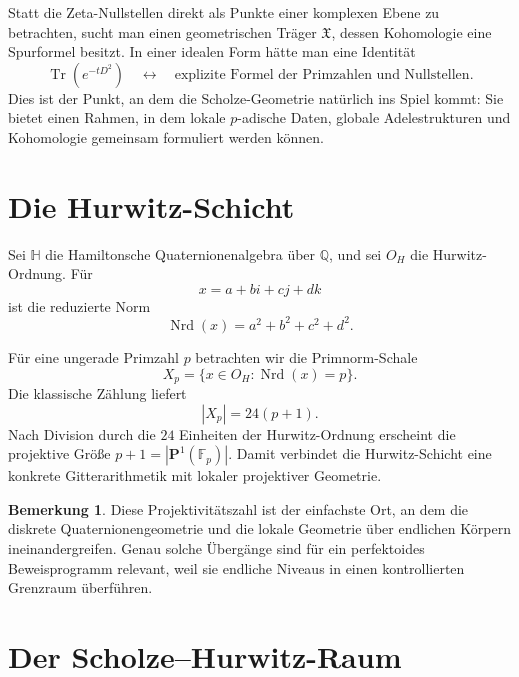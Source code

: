 \documentclass[11pt,a4paper,reqno]{amsart}
\theoremstyle{definition}
\newtheorem{remark}[theorem]{Bemerkung}
\numberwithin{equation}{section}
\newcommand{\Q}{\mathbb{Q}}
\newcommand{\HH}{\mathbb{H}}
\newcommand{\OH}{O_H}
\newcommand{\Nrd}{\operatorname{Nrd}}
\begin{document}
Statt die Zeta-Nullstellen direkt als Punkte einer komplexen Ebene zu betrachten, sucht man einen geometrischen Träger \(\mathfrak{X}\), dessen Kohomologie eine Spurformel besitzt. In einer idealen Form hätte man eine Identität
\begin{equation}
  \operatorname{Tr}\!\left(e^{-tD^2}\right)
  \quad\longleftrightarrow\quad
  \text{explizite Formel der Primzahlen und Nullstellen}.
\end{equation}
Dies ist der Punkt, an dem die Scholze-Geometrie natürlich ins Spiel kommt: Sie bietet einen Rahmen, in dem lokale \(p\)-adische Daten, globale Adelestrukturen und Kohomologie gemeinsam formuliert werden können.

\section{Die Hurwitz-Schicht}

Sei \(\HH\) die Hamiltonsche Quaternionenalgebra über \(\Q\), und sei \(\OH\) die Hurwitz-Ordnung. Für
\[
  x=a+bi+cj+dk
\]
ist die reduzierte Norm
\begin{equation}
  \Nrd(x)=a^2+b^2+c^2+d^2.
\end{equation}

Für eine ungerade Primzahl \(p\) betrachten wir die Primnorm-Schale
\begin{equation}
  X_p=\{x\in\OH:\Nrd(x)=p\}.
\end{equation}
Die klassische Zählung liefert
\begin{equation}
  |X_p|=24(p+1).
\end{equation}
Nach Division durch die \(24\) Einheiten der Hurwitz-Ordnung erscheint die projektive Größe \(p+1=|\mathbf{P}^1(\mathbb{F}_p)|\). Damit verbindet die Hurwitz-Schicht eine konkrete Gitterarithmetik mit lokaler projektiver Geometrie.

\begin{remark}
Diese Projektivitätszahl ist der einfachste Ort, an dem die diskrete Quaternionengeometrie und die lokale Geometrie über endlichen Körpern ineinandergreifen. Genau solche Übergänge sind für ein perfektoides Beweisprogramm relevant, weil sie endliche Niveaus in einen kontrollierten Grenzraum überführen.
\end{remark}

\section{Der Scholze--Hurwitz-Raum}
\end{document}
